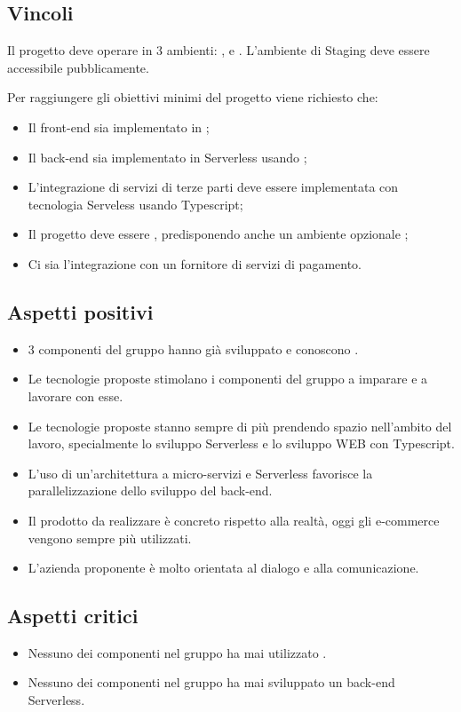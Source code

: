 \subsection{Vincoli}
Il progetto deve operare in 3 ambienti: ,  e . L'ambiente di Staging deve essere accessibile pubblicamente.

Per raggiungere gli obiettivi minimi del progetto viene richiesto che:
\begin{itemize}
	\item Il front-end sia implementato in ;
	\item Il back-end sia implementato in Serverless usando ;
	\item L'integrazione di servizi di terze parti deve essere implementata con tecnologia Serveless usando Typescript;
	\item Il progetto deve essere , predisponendo anche un ambiente opzionale ;
	\item Ci sia l'integrazione con un fornitore di servizi di pagamento.
\end{itemize}

\subsection{Aspetti positivi}
\begin{itemize}
	\item 3 componenti del gruppo hanno già sviluppato e conoscono .
	\item Le tecnologie proposte stimolano i componenti del gruppo a imparare e a lavorare con esse.
	\item Le tecnologie proposte stanno sempre di più prendendo spazio nell'ambito del lavoro, specialmente lo sviluppo Serverless e lo sviluppo WEB con Typescript.
	\item L'uso di un'architettura a micro-servizi e Serverless favorisce la parallelizzazione dello sviluppo del back-end.
	\item Il prodotto da realizzare è concreto rispetto alla realtà, oggi gli e-commerce vengono sempre più utilizzati.
	\item L'azienda proponente è molto orientata al dialogo e alla comunicazione.
\end{itemize}

\subsection{Aspetti critici}
\begin{itemize}
	\item Nessuno dei componenti nel gruppo ha mai utilizzato .
	\item Nessuno dei componenti nel gruppo ha mai sviluppato un back-end Serverless.
\end{itemize}


